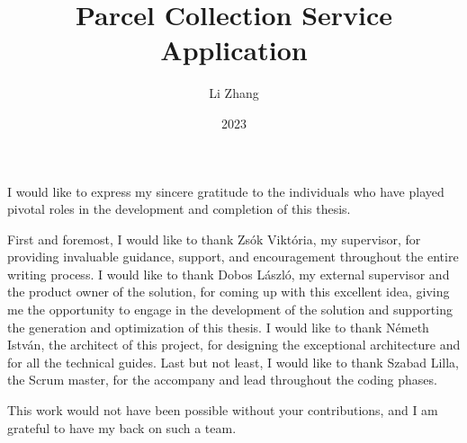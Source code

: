 \documentclass[
]{elteikthesis}[2023/04/10]
\title{Parcel Collection Service Application } %
\date{2023} %
\author{Li Zhang}
\affiliation{Assistant Professor} %
\begin{document}


\maketitle


\tableofcontents
\cleardoublepage


\cleardoublepage


\cleardoublepage


\cleardoublepage


\cleardoublepage

\chapter*{\acklabel}
I would like to express my sincere gratitude to the individuals who have played pivotal roles in the development and completion of this thesis.

First and foremost, I would like to thank Zsók Viktória, my supervisor, for providing invaluable guidance, support, and encouragement throughout the entire writing process. 
I would like to thank Dobos László, my external supervisor and the product owner of the solution, for coming up with this excellent idea, giving me the opportunity to engage in the development of the solution and supporting the generation and optimization of this thesis.
I would like to thank Németh István, the architect of this project, for designing the exceptional architecture and for all the technical guides.
Last but not least, I would like to thank Szabad Lilla, the Scrum master, for the accompany and lead throughout the coding phases.

This work would not have been possible without your contributions, and I am grateful to have my back on such a team.

% 
\end{document}
